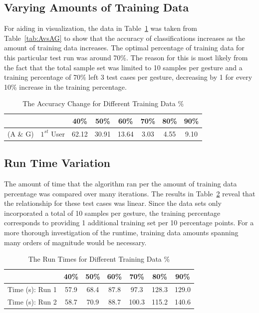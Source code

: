 \documentclass[conference]{IEEEtran}
\newcommand{\TabRef}[1]{Table~\ref{tab:#1}}
\begin{document}

\subsection{Varying Amounts of Training Data}
For aiding in visualization, the data in \TabRef{VaryTrain} was taken from \TabRef{AvsAG} to show that the accuracy of classifications increases as the amount of training data increases. The optimal percentage of training data for this particular test run was around 70\%. The reason for this is most likely from the fact that the total sample set was limited to 10 samples per gesture and a training percentage of 70\% left 3 test cases per gesture, decreasing by 1 for every 10\% increase in the training percentage.


\begin{table}[h]
\renewcommand{\arraystretch}{1.5}
\caption{The Accuracy Change for Different Training Data \%} \label{tab:VaryTrain}
\centering
\resizebox{8cm}{!} {
\begin{tabular}{r l||c|c|c|c|c|c}
    \hline    \hline
    &  & 40\%  & 50\%  & 60\%  & 70\%  & 80\%  & 90\% \\
    \hline    \hline
     (A \& G) & $1^{st}$ User & 62.12 & 30.91 & 13.64 & 3.03 & 4.55 & 9.10\\
    \hline    \hline
\end{tabular}
}
\end{table}
	
	
	

\subsection{Run Time Variation}
The amount of time that the algorithm ran per the amount of training data percentage was compared over many iterations. The results in \TabRef{RunTimes} reveal that the relationship for these test cases was linear. Since the data sets only incorporated a total of 10 samples per gesture, the training percentage corresponds to providing 1 additional training set per 10 percentage points. For a more thorough investigation of the runtime, training data amounts spanning many orders of magnitude would be necessary.

\begin{table}[h]
\renewcommand{\arraystretch}{1.5}
\caption{The Run Times for Different Training Data \%} \label{tab:RunTimes}
\centering
\begin{tabular}{c||c|c|c|c|c|c}
    \hline    \hline
                             & 40\%  & 50\% & 60\% & 70\% & 80\% & 90\%\\
    \hline
     Time (s): Run 1 & 57.9 & 68.4 & 87.8 & 97.3 & 128.3 & 129.0\\
     \hline
     Time (s): Run 2 & 58.7 &  70.9  & 88.7  &100.3 & 115.2 & 140.6\\
    \hline    \hline
\end{tabular}
\end{table}
\hfill
\end{document}
